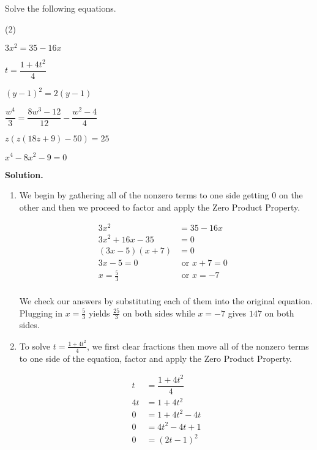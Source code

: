 \begin{ex}\label{solveeqnbyfactoring}  Solve the following equations.

\begin{tasks}(2)

\task  $3x^2 = 35 - 16x$

\task  $t = \dfrac{1+4t^2}{4}$

\task  $(y-1)^2 = 2(y-1)$

\task  $\dfrac{w^4}{3} = \dfrac{8w^3-12}{12} - \dfrac{w^2-4}{4}$

\task  $z(z(18z+9)-50) = 25$

\task  $x^4-8x^2 - 9 = 0$

\end{tasks}

{\bf Solution.}

\begin{enumerate}

\item  We begin by gathering all of the nonzero terms to one side getting $0$ on the other and then we proceed to factor and apply the Zero Product Property.

\begin{align*}
3x^2 & = 35 - 16x \\
3x^2 + 16x - 35 & = 0 \tag{Add $16x$, subtract $35$} \\
(3x-5)(x+7) & = 0 \tag{Factor} \\
3x-5 = 0 & \text{ or } x+7 = 0 \tag{Zero Product Property} \\
x = \frac{5}{3} & \text{ or } x = -7 & \\ 
\end{align*}

We check our answers by substituting each of them into the original equation.  Plugging in $x = \frac{5}{3}$ yields $\frac{25}{3}$ on both sides while $x = -7$ gives $147$ on both sides.

\item To solve $t = \frac{1+4t^2}{4}$, we first clear fractions then move all of the nonzero terms to one side of the equation, factor and apply the Zero Product Property.

\begin{align*}
t & = \dfrac{1+4t^2}{4} \\
4t & = 1+4t^2 \tag{Clear fractions (multiply by $4$)} \\
0 & = 1+4t^2 - 4t \tag{Subtract 4} \\
0 & = 4t^2 - 4t + 1 \tag{Rearrange terms} \\
0 & = (2t-1)^2 \tag{Factor\textemdash Perfect Square Trinomial)} \\
\end{align*}


\end{enumerate}
\end{ex}
